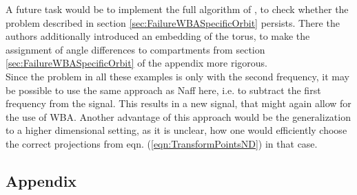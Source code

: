 A future task would be to implement the full algorithm of \cite{DasSaiSanYor2019}, to check whether the problem described in section \ref{sec:FailureWBASpecificOrbit} persists.
There the authors additionally introduced an embedding of the torus, to make the assignment of angle differences to compartments from section \ref{sec:FailureWBASpecificOrbit} of the appendix more rigorous.
\\
Since the problem in all these examples is only with the second frequency, it may be possible to use the same approach as Naff here, i.e. to subtract the first frequency from the signal.
This results in a new signal, that might again allow for the use of WBA.
Another advantage of this approach would be the generalization to a higher dimensional setting, as it is unclear, how one would efficiently choose the correct projections from eqn. (\ref{eqn:TransformPointsND}) in that case.


\begin{appendix}
\appendix
\renewcommand{\thesection}{\Alph{section}}
    
\chapter*{Appendix}

\end{appendix}

